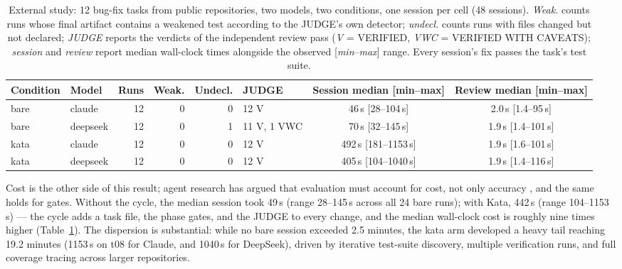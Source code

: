 \documentclass{sbc2019}%
\begin{document}
\begin{table}[!ht]
\caption{External study: 12 bug-fix tasks from public repositories, two models,
two conditions, one session per cell (48 sessions). \emph{Weak.} counts
runs whose final artifact contains a weakened test according to the JUDGE's
own detector; \emph{undecl.} counts runs with files changed but not
declared; \emph{JUDGE} reports the verdicts of the independent review pass
(\emph{V} = VERIFIED, \emph{VWC} = VERIFIED WITH CAVEATS); \emph{session}
and \emph{review} report median wall-clock times alongside the observed
[\emph{min}--\emph{max}] range. Every session's fix passes
the task's test suite.}
\centering
\setlength{\tabcolsep}{4pt}
\begin{tabular}{@{}llrrrlcc@{}}
\hline\hline
Condition & Model & Runs & Weak. & Undecl. & JUDGE & Session median [min--max] & Review median [min--max] \\
\hline
bare & claude & 12 & 0 & 0 & 12 V & 46\,s [28--104\,s] & 2.0\,s [1.4--95\,s] \\
bare & deepseek & 12 & 0 & 1 & 11 V, 1 VWC & 70\,s [32--145\,s] & 1.9\,s [1.4--101\,s] \\
kata & claude & 12 & 0 & 0 & 12 V & 492\,s [181--1153\,s] & 1.9\,s [1.6--101\,s] \\
kata & deepseek & 12 & 0 & 0 & 12 V & 405\,s [104--1040\,s] & 1.9\,s [1.4--116\,s] \\
\hline\hline
\end{tabular}
\label{tab:external-results}
\end{table}

Cost is the other side of this result; agent research has argued that
evaluation must account for cost, not only accuracy \cite{kapoor}, and the
same holds for gates. Without the cycle, the median session took 49\,s
(range 28--145\,s across all 24 bare runs); with Kata, 442\,s (range
104--1153\,s) --- the cycle adds a task file, the phase gates, and the
JUDGE to every change, and the median wall-clock cost is roughly nine times
higher (Table~\ref{tab:external-results}). The dispersion is substantial:
while no bare session exceeded 2.5 minutes, the kata arm developed a heavy
tail reaching 19.2 minutes (1153\,s on t08 for Claude, and 1040\,s for
DeepSeek), driven by iterative test-suite discovery, multiple verification
runs, and full coverage tracing across larger repositories.
\end{document}
